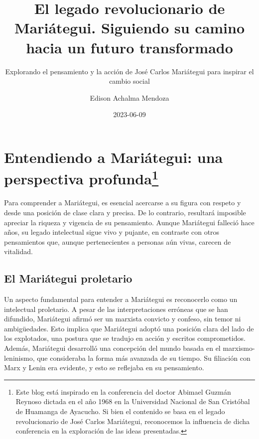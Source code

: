 \documentclass[
  letterpaper,
  DIV=11,
  numbers=noendperiod]{scrartcl}
\title{El legado revolucionario de Mariátegui. Siguiendo su camino hacia
un futuro transformado}
\subtitle{Explorando el pensamiento y la acción de José Carlos
Mariátegui para inspirar el cambio social}
\author{Edison Achalma Mendoza}
\date{2023-06-09}
\begin{document}
\maketitle
\ifdefined\Shaded\renewenvironment{Shaded}{\begin{tcolorbox}[enhanced, breakable, boxrule=0pt, interior hidden, sharp corners, frame hidden, borderline west={3pt}{0pt}{shadecolor}]}{\end{tcolorbox}}\fi

\hypertarget{entendiendo-a-mariuxe1tegui-una-perspectiva-profunda}{%
\section[Entendiendo a Mariátegui: una perspectiva
profunda]{\texorpdfstring{Entendiendo a Mariátegui: una perspectiva
profunda\footnote{Este blog está inspirado en la conferencia del doctor
  Abimael Guzmán Reynoso dictada en el año 1968 en la Universidad
  Nacional de San Cristóbal de Huamanga de Ayacucho. Si bien el
  contenido se basa en el legado revolucionario de José Carlos
  Mariátegui, reconocemos la influencia de dicha conferencia en la
  exploración de las ideas presentadas.}}{Entendiendo a Mariátegui: una perspectiva profunda}}\label{entendiendo-a-mariuxe1tegui-una-perspectiva-profunda}}

Para comprender a Mariátegui, es esencial acercarse a su figura con
respeto y desde una posición de clase clara y precisa. De lo contrario,
resultará imposible apreciar la riqueza y vigencia de su pensamiento.
Aunque Mariátegui falleció hace años, su legado intelectual sigue vivo y
pujante, en contraste con otros pensamientos que, aunque pertenecientes
a personas aún vivas, carecen de vitalidad.

\hypertarget{el-mariuxe1tegui-proletario}{%
\subsection{El Mariátegui
proletario}\label{el-mariuxe1tegui-proletario}}

Un aspecto fundamental para entender a Mariátegui es reconocerlo como un
intelectual proletario. A pesar de las interpretaciones erróneas que se
han difundido, Mariátegui afirmó ser un marxista convicto y confeso, sin
temor ni ambigüedades. Esto implica que Mariátegui adoptó una posición
clara del lado de los explotados, una postura que se tradujo en acción y
escritos comprometidos. Además, Mariátegui desarrolló una concepción del
mundo basada en el marxismo-leninismo, que consideraba la forma más
avanzada de su tiempo. Su filiación con Marx y Lenin era evidente, y
esto se reflejaba en su pensamiento.
\end{document}
